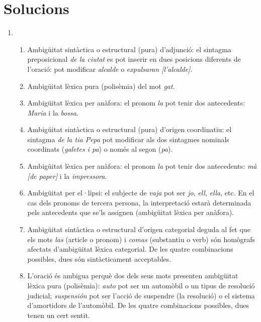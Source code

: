 \section{Solucions}

\begin{enumerate}
\item \begin{enumerate}
  \item Ambigüitat sintàctica o estructural (pura) d'adjunció: el
    sintagma preposicional \emph{de la ciutat} es pot inserir en dues
    posicions diferents de l'oració: pot modificar \emph{alcalde} o
    \emph{expulsaran [l'alcalde]}.
  \item Ambigüitat lèxica pura (polisèmia) del mot \emph{gat}.
  \item Ambigüitat lèxica per anàfora: el pronom \emph{la} pot tenir
    dos antecedents: \emph{Maria} i la \emph{bossa}.
  \item Ambigüitat sintàctica o estructural (pura) d'origen
    coordinatiu: el sintagma \emph{de la tia Pepa} pot modificar als
    dos sintagmes nominals coordinats (\emph{galetes i pa}) o només al
    segon (\emph{pa}).
  \item Ambigüitat lèxica per anàfora: el pronom \emph{la} pot tenir
    dos antecedents: \emph{mà [de paper]} i la \emph{impressora}.
  \item Ambigüitat per el·lipsi: el subjecte de \emph{vaja} pot ser
    \emph{jo}, \emph{ell}, \emph{ella}, etc. En el cas dels pronoms de
    tercera persona, la interpretació estarà determinada pels
    antecedents que se'ls assignen (ambigüitat lèxica per anàfora).
  \item Ambigüitat sintàctica o estructural d'origen categorial deguda
    al fet que els mots \emph{las} (article o pronom) i \emph{comas}
    (substantiu o verb) són homògrafs afectats d'ambigüitat lèxica
    categorial. De les quatre combinacions possibles, dues són
    sintàcticament acceptables.
  \item L'oració és ambigua perquè dos dels seus mots presenten
    ambigüitat lèxica pura (polisèmia): \emph{auto} pot ser un
    automòbil o un tipus de resolució judicial; \emph{suspensión} pot
    ser l'acció de suspendre (la resolució) o el sistema d'amortidors
    de l'automòbil. De les quatre combinacions possibles, dues tenen
    un cert sentit.  


\end{enumerate}
\end{enumerate}
